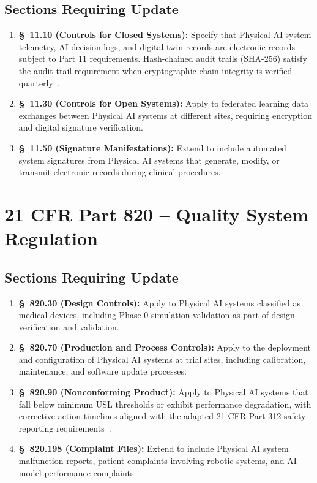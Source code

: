 \documentclass[11pt,letterpaper]{article}
\begin{document}
\subsection{Sections Requiring Update}

\begin{enumerate}[label=(\alph*)]
\item \textbf{\S~11.10 (Controls for Closed Systems):} Specify that Physical
  AI system telemetry, AI decision logs, and digital twin records are
  electronic records subject to Part 11 requirements. Hash-chained audit
  trails (SHA-256) satisfy the audit trail requirement when cryptographic
  chain integrity is verified quarterly~\cite{iche6r3adapt}.

\item \textbf{\S~11.30 (Controls for Open Systems):} Apply to federated
  learning data exchanges between Physical AI systems at different sites,
  requiring encryption and digital signature verification.

\item \textbf{\S~11.50 (Signature Manifestations):} Extend to include
  automated system signatures from Physical AI systems that generate,
  modify, or transmit electronic records during clinical procedures.
\end{enumerate}

\section{21 CFR Part 820 -- Quality System Regulation}

\subsection{Sections Requiring Update}

\begin{enumerate}[label=(\alph*)]
\item \textbf{\S~820.30 (Design Controls):} Apply to Physical AI systems
  classified as medical devices, including Phase 0 simulation validation as
  part of design verification and validation.

\item \textbf{\S~820.70 (Production and Process Controls):} Apply to the
  deployment and configuration of Physical AI systems at trial sites,
  including calibration, maintenance, and software update processes.

\item \textbf{\S~820.90 (Nonconforming Product):} Apply to Physical AI
  systems that fall below minimum USL thresholds or exhibit performance
  degradation, with corrective action timelines aligned with the adapted
  21 CFR Part 312 safety reporting requirements~\cite{cfr312adapt}.

\item \textbf{\S~820.198 (Complaint Files):} Extend to include Physical AI
  system malfunction reports, patient complaints involving robotic systems,
  and AI model performance complaints.
\end{enumerate}
\end{document}
